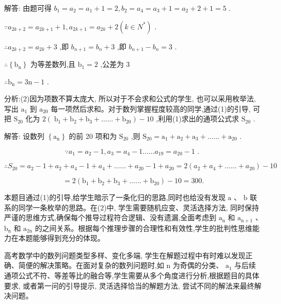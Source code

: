 \documentclass[10pt]{article}
\begin{document}
解答: 由题可得 \({b}_{1} = {a}_{2} = {a}_{1} + 1 = 2,{b}_{2} = {a}_{4} = {a}_{3} + 1 = {a}_{2} + 2 + 1 = 5\) .

\(\because {a}_{{2k} + 2} = {a}_{{2k} + 1} + 1,{a}_{{2k} + 1} = {a}_{2k} + 2\left( {k \in  {N}^{ * }}\right)\) .

\(\therefore {a}_{{2k} + 2} = {a}_{2k} + 3\) ,即 \({b}_{n + 1} = {b}_{n} + 3\) ,即 \({b}_{n + 1} - {b}_{n} = 3\) .

\(\therefore \left\{  {\mathrm{b}}_{\mathrm{n}}\right\}\) 为等差数列,且 \({\mathrm{b}}_{1} = 2\) ,公差为 3

\(\therefore {\mathrm{b}}_{\mathrm{n}} = 3\mathrm{n} - 1\) .

分析:(2)因为项数不算太庞大, 所以对于不会求和公式的学生, 也可以采用枚举法,写出 \({\mathrm{a}}_{1}\) 到 \({\mathrm{a}}_{20}\) 每一项然后求和。对于数列掌握程度较高的同学,通过(1)的引导, 可把 \({\mathrm{S}}_{20}\) 化为 \(2\left( {{\mathrm{\;b}}_{1} + {\mathrm{b}}_{2} + {\mathrm{b}}_{3} + \ldots \ldots  + {\mathrm{b}}_{20}}\right)  - {10}\) ,利用(1)求出的通项公式求 \({\mathrm{S}}_{20}\) .

解答: 设数列 \(\left\{  {\mathrm{a}}_{\mathrm{n}}\right\}\) 的前 20 项和为 \({\mathrm{S}}_{20}\) ,则 \({\mathrm{S}}_{20} = {\mathrm{a}}_{1} + {\mathrm{a}}_{2} + {\mathrm{a}}_{3} + \ldots \ldots  + {\mathrm{a}}_{20}\) .

\[
\because {a}_{1} = {a}_{2} - 1,{a}_{3} = {a}_{4} - 1\ldots \ldots {a}_{19} = {a}_{20} - 1\text{ . }
\]

\[
\therefore {S}_{20} = {a}_{2} - 1 + {a}_{2} + {a}_{4} - 1 + {a}_{4} + \ldots \ldots  + {a}_{20} - 1 + {a}_{20} = 2\left( {{a}_{2} + {a}_{4} + \ldots \ldots  + {a}_{20}}\right)  - {10}
\]

\[
= 2\left( {{\mathrm{b}}_{1} + {\mathrm{b}}_{2} + {\mathrm{b}}_{3} + \ldots \ldots  + {\mathrm{b}}_{20}}\right)  - {10} = {300}.
\]

本题目通过(1)的引导,给学生暗示了一条化归的思路,同时也给没有发现 \(\mathrm{a}\) 、 \(\mathrm{b}\) 联系的同学一条枚举的思路。在(2)中, 学生需要随机应变、灵活选择方法, 同时保持严谨的思维方式,确保每个推导过程符合逻辑、没有遗漏,全面考虑到 \({\mathrm{a}}_{\mathrm{n}}\) 和 \({\mathrm{a}}_{\mathrm{n} + 1}\) 、 \({\mathrm{b}}_{\mathrm{n}}\) 和 \({\mathrm{a}}_{2\mathrm{n}}\) 的之间关系。根据每个推理步骤的合理性和有效性,学生的批判性思维能力在本题能够得到充分的体现。

高考数学中的数列问题类型多样、变化多端, 学生在解题过程中有时难以发现正确、简便的解决策略。在面对复杂的数列问题时,如 \(\mathrm{n}\) 为奇偶的分类、 \({\mathrm{a}}_{1}\) 与后续通项公式不符、等差等比的融合等,学生需要从多个角度进行分析,根据题目的具体要求, 或者第一问的引导提示, 灵活选择恰当的解题方法, 尝试不同的解法来最终解决问题。
\end{document}
